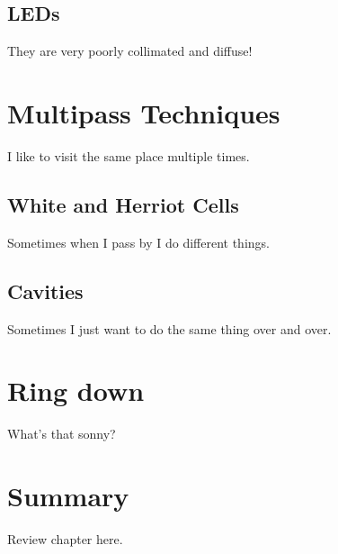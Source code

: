 \subsection{LEDs}
They are very poorly collimated and diffuse!

\section{Multipass Techniques}
I like to visit the same place multiple times.

\subsection{White and Herriot Cells}
Sometimes when I pass by I do different things.

\subsection{Cavities}
Sometimes I just want to do the same thing over and over.

\section{Ring down}
What's that sonny?

\section{Summary}
Review chapter here.
